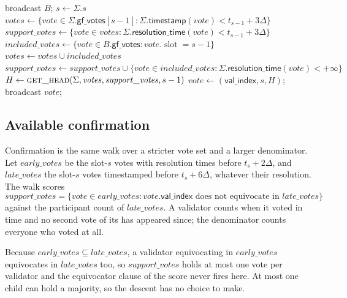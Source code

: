 \documentclass{article}
\theoremstyle{plain}
\theoremstyle{definition}
\theoremstyle{remark}
\newcommand{\slot}{\operatorname{slot}}
\newcommand{\valindex}{\mathsf{val\_index}}
\newcommand{\committee}{\mathcal K}
\newcommand{\T}{\mathcal T}
\newcommand{\gfPool}{\mathsf{gf\_votes}}
\newcommand{\timestamp}{\mathsf{timestamp}}
\newcommand{\resolutionTime}{\mathsf{resolution\_time}}
\begin{document}
{\begin{algorithmic}[1]
  \State broadcast $B$; 
\EndFunction
\vspace{1pt}
  \State $s\gets\Sigma.s$
  \State $\mathit{votes}\gets\{\mathit{vote}\in\Sigma.\gfPool[s-1]:
    \Sigma.\timestamp(\mathit{vote})<t_{s-1}+3\Delta\}$
  \State $\mathit{support\_votes}\gets\{\mathit{vote}\in\mathit{votes}:
    \Sigma.\resolutionTime(\mathit{vote})<t_{s-1}+3\Delta\}$
  \ForAll{$B\in\Sigma.\T$ with $B.\slot=s$}
    \State $\mathit{included\_votes}\gets
      \{\mathit{vote}\in B.\gfPool:\mathit{vote}.\slot=s-1\}$
    \State $\mathit{votes}\gets\mathit{votes}\cup\mathit{included\_votes}$
    \State $\mathit{support\_votes}\gets\mathit{support\_votes}\cup
      \{\mathit{vote}\in\mathit{included\_votes}:
        \Sigma.\resolutionTime(\mathit{vote})<+\infty\}$
  \EndFor
  \State $H\gets\Call{get\_head}{\Sigma,\mathit{votes},
    \mathit{support\_votes},s-1}$
  \If{$\valindex\in\committee_s$}
    \State $\mathit{vote}\gets(\valindex,s,H)$; broadcast $\mathit{vote}$;
  \EndIf
\EndFunction
\end{algorithmic}
}

\subsection{Available confirmation}\label{sec:available-confirmation}

Confirmation is the same walk over a stricter vote set and a larger
denominator.  Let $\mathit{early\_votes}$ be the slot-$s$ votes with
resolution times before $t_s+2\Delta$, and $\mathit{late\_votes}$ the slot-$s$ votes
timestamped before $t_s+6\Delta$, whatever their resolution.  The walk scores
\[
 \mathit{support\_votes}=\{\mathit{vote}\in\mathit{early\_votes}:
  \mathit{vote}.\valindex\text{ does not equivocate in }
  \mathit{late\_votes}\}
\]
against the participant count of $\mathit{late\_votes}$.  A validator counts when it
voted in time and no second vote of its has appeared since; the denominator
counts everyone who voted at all.

Because $\mathit{early\_votes}\subseteq\mathit{late\_votes}$, a validator
equivocating in $\mathit{early\_votes}$ equivocates in
$\mathit{late\_votes}$ too, so $\mathit{support\_votes}$
holds at most one vote per validator and the equivocator clause of the score
never fires here.  At most one child can hold a majority, so the descent
has no choice to make.
\end{document}
